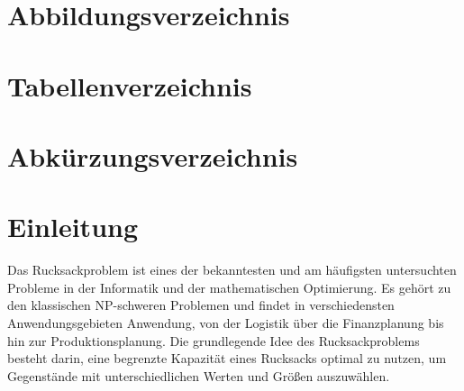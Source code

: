 \documentclass[12pt]{report}
\begin{document}
\tableofcontents
{}
\thispagestyle{plain}
\newpage
\chapter*{Abbildungsverzeichnis}

\listoffigures




\newpage
\chapter*{Tabellenverzeichnis}

\listoftables


\newpage
\chapter*{Abkürzungsverzeichnis}

\begin{acronym}[SOAP]
\end{acronym}


\addtocounter{frontmatterPage}{\value{page}} 

\newpage
{}
\chapter{Einleitung}
Das Rucksackproblem ist eines der bekanntesten und am häufigsten untersuchten Probleme in der Informatik und der mathematischen Optimierung. Es gehört zu den klassischen NP-schweren Problemen und findet in verschiedensten Anwendungsgebieten Anwendung, von der Logistik über die Finanzplanung bis hin zur Produktionsplanung. Die grundlegende Idee des Rucksackproblems besteht darin, eine begrenzte Kapazität eines Rucksacks optimal zu nutzen, um Gegenstände mit unterschiedlichen Werten und Größen auszuwählen. 
\end{document}
